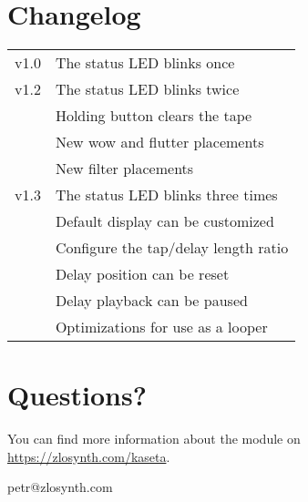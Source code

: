 \documentclass[11pt]{article}
\begin{document}
\begin{minipage}[t]{0.3\textwidth}
\section{Changelog}

\begin{tabular}{@{}rl@{}}
  v1.0 & The status LED blinks once \\
  v1.2 & The status LED blinks twice \\
   & Holding button clears the tape \\
   & New wow and flutter placements \\
   & New filter placements \\
  v1.3 & The status LED blinks three times \\
   & Default display can be customized \\
   & Configure the tap/delay length ratio \\
   & Delay position can be reset \\
   & Delay playback can be paused \\
   & Optimizations for use as a looper
\end{tabular}

\end{minipage}
\begin{minipage}{0.05\textwidth}
\phantom{ }
\end{minipage}%
\begin{minipage}[t]{0.3\textwidth}
\setlength{\parskip}{6pt}
\section{Questions?}

You can find more information about the module on
\url{https://zlosynth.com/kaseta}.

\vspace{3mm}

\begin{center}
petr@zlosynth.com
\end{center}
\end{minipage}
\end{document}
